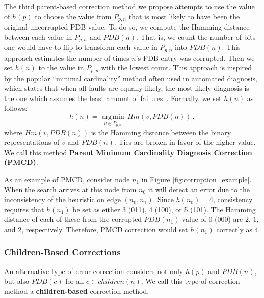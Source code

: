 \documentclass[letterpaper]{article}
\DeclareMathOperator*{\argmin}{\arg\!\min}
\begin{document}
The third parent-based correction method we propose attempts to use the value of $h(p)$ to choose the value from $P_{p,n}$ that is most likely to have been the original uncorrupted PDB value. To do so, we compute the Hamming distance between each value in $P_{p,n}$ and $PDB(n)$. That is, we count the number of bits one would have to flip to transform each value in $P_{p,n}$ into $PDB(n)$. %
This approach estimates the number of times $n$'s PDB entry was corrupted. Then we set $h(n)$ to the value in $P_{p,n}$ with the lowest count. This approach is inspired by the popular ``minimal cardinality'' method often used in automated diagnosis, which states that when all faults are equally likely, the most likely diagnosis is the one which assumes the least amount of failures~\cite{de1987diagnosing}.
Formally, we set $h(n)$ as follows:
\begin{equation}
h(n) = \underset{v \in P_{p,n}}{\argmin} \, Hm(v, PDB(n)) \,,
\end{equation}
\noindent
where $Hm(v, PDB(n))$ is the Hamming distance between the binary representations of $v$ and $PDB(n)$. Ties are broken in favor of the higher value.
We call this method \textbf{Parent Minimum Cardinality Diagnosis Correction (PMCD)}.

As an example of PMCD, consider node $n_1$ in Figure \ref{fig:corruption_example}. When the search arrives at this node from $n_0$ it will detect an error due to the inconsistency of the heuristic on edge $(n_0, n_1)$.
Since $h(n_0)=4$, consistency requires that $h(n_1)$ be set as either 3 (011), 4 (100), or 5 (101). The Hamming distance of each of these from the corrupted $PDB(n_1)$ value of 0 (000) are 2, 1, and 2, respectively.
Therefore, PMCD correction would set $h(n_1)$ correctly as 4.

\subsubsection{Children-Based Corrections}

An alternative type of error correction considers not only $h(p)$ and $PDB(n)$, but also $PDB(c)$ for all $c \in children(n)$. We call this type of correction method a \textbf{children-based} correction method.
\end{document}
